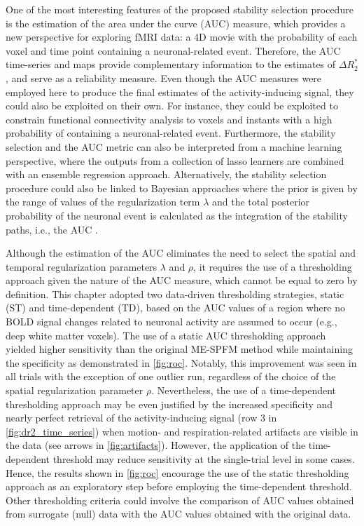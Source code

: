 One of the most interesting features of the proposed stability selection
procedure is the estimation of the area under the curve (AUC) measure, which
provides a new perspective for exploring fMRI data: a 4D movie with the
probability of each voxel and time point containing a neuronal-related event.
Therefore, the AUC time-series and maps provide complementary information to the
estimates of $\Delta R_2^*$, and serve as a reliability measure. Even though the
AUC measures were employed here to produce the final estimates of the
activity-inducing signal, they could also be exploited on their own. For
instance, they could be exploited to constrain functional connectivity analysis
\citep{Tagliazucchi2016VoxelWiseFunctional,Faskowitz2020Edgecentricfunctional}
to voxels and instants with a high probability of containing a neuronal-related
event. Furthermore, the stability selection and the AUC metric can also be
interpreted from a machine learning perspective, where the outputs from a
collection of lasso learners are combined with an ensemble regression approach.
Alternatively, the stability selection procedure could also be linked to
Bayesian approaches where the prior is given by the range of values of the
regularization term $\lambda$ and the total posterior probability of the
neuronal event is calculated as the integration of the stability paths, i.e.,
the AUC \citep[see discussion in][]{Meinshausen2010Stabilityselection}.

Although the estimation of the AUC eliminates the need to select the spatial and
temporal regularization parameters $\lambda$ and $\rho$, it requires the use of
a thresholding approach given the nature of the AUC measure, which cannot be
equal to zero by definition. This chapter adopted two data-driven thresholding
strategies, static (ST) and time-dependent (TD), based on the AUC values of a
region where no BOLD signal changes related to neuronal activity are assumed to
occur (e.g., deep white matter voxels). The use of a static AUC thresholding
approach yielded higher sensitivity than the original ME-SPFM method
\citep{CaballeroGaudes2019deconvolutionalgorithmmulti} while maintaining the
specificity as demonstrated in \cref{fig:roc}. Notably, this improvement was
seen in all trials with the exception of one outlier run, regardless of the
choice of the spatial regularization parameter $\rho$. Nevertheless, the use of
a time-dependent thresholding approach may be even justified by the increased
specificity and nearly perfect retrieval of the activity-inducing signal (row 3
in \cref{fig:dr2_time_series}) when motion- and respiration-related artifacts
are visible in the data (see arrows in \cref{fig:artifacts}). However, the
application of the time-dependent threshold may reduce sensitivity at the
single-trial level in some cases. Hence, the results shown in \cref{fig:roc}
encourage the use of the static thresholding approach as an exploratory step
before employing the time-dependent threshold. Other thresholding criteria could
involve the comparison of AUC values obtained from surrogate (null) data
\citep{Liegeois2021Interpretingnullmodels} with the AUC values obtained with the
original data.

